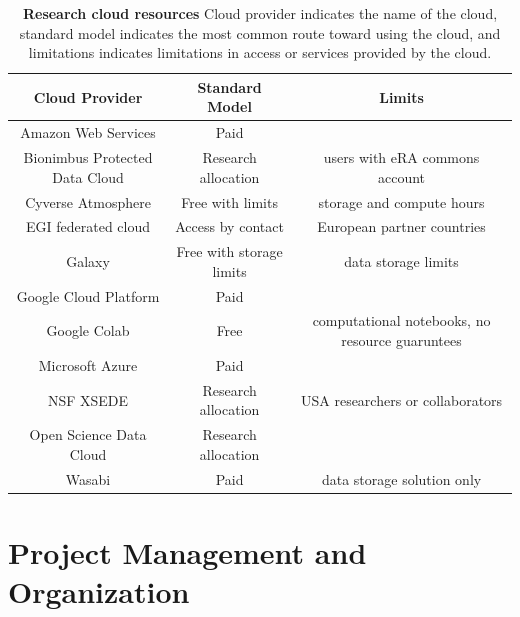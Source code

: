 \documentclass[10pt,letterpaper]{article}
\begin{document}
\begin{table}
\begin{tabular}{|c|c|c|}
\hline
Cloud Provider & Standard Model & Limits \\
\hline
Amazon Web Services & Paid & \\
\hline
Bionimbus Protected Data Cloud & Research allocation & users with eRA commons account \\
\hline
Cyverse Atmosphere & Free with limits & storage and compute hours \\
\hline
EGI federated cloud & Access by contact & European partner countries \\
\hline
Galaxy & Free with storage limits & data storage limits \\
\hline
Google Cloud Platform & Paid & \\
\hline
Google Colab & Free & computational notebooks, no resource guaruntees \\
\hline
Microsoft Azure & Paid & \\
\hline
NSF XSEDE & Research allocation & USA researchers or collaborators \\
\hline
Open Science Data Cloud & Research allocation & \\
\hline
Wasabi & Paid & data storage solution only \\
\hline
\end{tabular} 
\caption{\label{tab:computational_resources} \textbf{Research cloud resources} Cloud provider indicates the name of the cloud, standard model indicates the most common route toward using the cloud, and limitations indicates limitations in access or services provided by the cloud.}
\end{table}

% 

\section*{Project Management and Organization}
\end{document}

